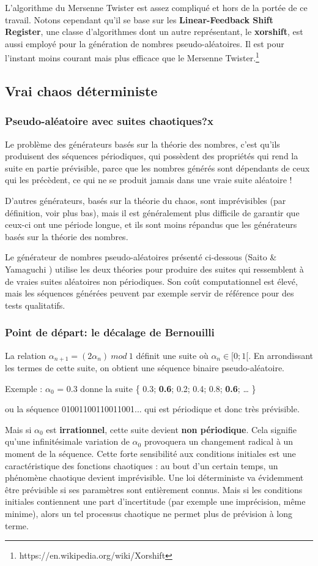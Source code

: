 \documentclass{scrartcl}
\begin{document}
L'algorithme du Mersenne Twister est assez compliqué et hors de la portée de ce
travail. Notons cependant qu'il se base sur les  \textbf{Linear-Feedback Shift
  Register}, une classe d'algorithmes dont un autre représentant, le
\textbf{xorshift}, est aussi employé pour la génération de nombres
pseudo-aléatoires. Il est pour l'instant moins courant mais plus efficace que
le Mersenne Twister.\footnote{https://en.wikipedia.org/wiki/Xorshift}

\subsection{Vrai chaos déterministe}
\subsubsection{Pseudo-aléatoire avec suites chaotiques?x}
Le problème des générateurs basés sur la théorie des nombres, c’est qu’ils
produisent des séquences périodiques, qui possèdent des propriétés qui rend la
suite en partie prévisible, parce que les nombres générés sont dépendants de
ceux qui les précèdent, ce qui ne se produit jamais dans une vraie suite
aléatoire ! \par
D’autres générateurs, basés sur la théorie du chaos, sont imprévisibles (par
définition, voir plus bas), mais il est généralement plus difficile de garantir
que ceux-ci ont une période longue, et ils sont moins répandus que les
générateurs basés sur la théorie des nombres. \par
Le générateur de nombres pseudo-aléatoires présenté ci-dessous (Saito \&
Yamaguchi \cite{SY}) utilise les deux théories pour produire des suites qui
ressemblent à de vraies suites aléatoires non périodiques. Son coût
computationnel est élevé, mais les séquences générées peuvent par exemple servir
de référence pour des tests qualitatifs.

\subsubsection{Point de départ: le décalage de Bernouilli}
La relation $\alpha_{n+1}=(2\alpha_n)\ mod\ 1$ définit une suite où
$\alpha_n \in [0;1[$. En arrondissant les termes de cette suite, on obtient une
séquence binaire pseudo-aléatoire. \par
Exemple : $\alpha_0$ = 0.3 donne la suite \{ 0.3; \textbf{0.6}; 0.2; 0.4; 0.8;
\textbf{0.6}; … \} \par
ou la séquence 01001100110011001... qui est périodique et donc très
prévisible. \par
Mais si $\alpha_0$ est \textbf{irrationnel}, cette suite devient \textbf{non
  périodique}. Cela signifie qu’une infinitésimale variation de $\alpha_0$
provoquera un changement radical à un moment de la séquence. Cette forte
sensibilité aux conditions initiales est une caractéristique des fonctions
chaotiques : au bout d'un certain temps, un phénomène chaotique devient
imprévisible.  Une loi déterministe va évidemment être prévisible si ses
paramètres sont entièrement connus. Mais si les conditions initiales contiennent
une part d’incertitude (par exemple une imprécision, même minime), alors un tel
processus chaotique ne permet plus de prévision à long terme.
\end{document}
